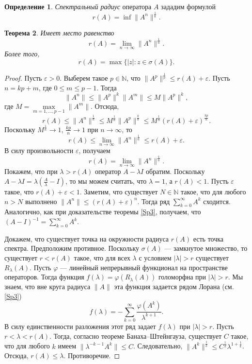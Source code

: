\documentclass[12pt, titlepage, oneside]{amsbook}
\newcommand{\NN}{\mathbb{N}}
\newtheorem{theorem}{Теорема}[chapter]
\theoremstyle{definition}
\newtheorem{definition}[theorem]{Определение}
\theoremstyle{remark}
\begin{document}
\begin{definition}
	\emph{Спектральный радиус} оператора $A$ зададим формулой $$r(A)=\inf\|A^n\|^{\frac{1}{n}}.$$
\end{definition}

\begin{theorem}
	\label{Sp6}
	Имеет место равенство
	$$r(A)=\lim\limits_{n\rightarrow\infty}\|A^n\|^{\frac{1}{n}}.$$ Более того, $$r(A)=\max\{|z|:z\in\sigma(A)\}.$$
\end{theorem}

\begin{proof}
	Пусть $\varepsilon>0$. Выберем такое $p\in\NN$, что $\|A^p\|^{\frac{1}{p}}\leq r(A)+\varepsilon$. Пусть $n=kp+m$, где $0\leq m\leq p-1$. Тогда $$\|A^n\|\leq\|A^p\|^k\|A^m\|\leq M\|A^p\|^k,$$ где $M=\max\limits_{m=1,\ldots,p-1}\|A^m\|$. Отсюда, $$r(A)\leq\|A^n\|^{\frac{1}{n}}\leq M^{\frac{1}{n}}\|A^p\|^{\frac{k}{n}}\leq M^{\frac{1}{n}}(r(A)+\varepsilon)^{\frac{kp}{n}}.$$ Поскольку $M^{\frac{1}{n}}\rightarrow 1$, $\frac{kp}{n}\rightarrow 1$ при $n\rightarrow\infty$, то $$r(A)\leq\lim\limits_{n\rightarrow\infty}\|A^n\|^{\frac{1}{n}}\leq r(A)+\varepsilon.$$ В силу произвольности $\varepsilon$, получаем $$r(A)=\lim\limits_{n\rightarrow\infty}\|A^n\|^{\frac{1}{n}}.$$ Покажем, что при $\lambda>r(A)$ оператор $A-\lambda I$ обратим. Поскольку $A-\lambda I=\lambda(\frac{A}{\lambda}-I)$, то мы можем считать, что $\lambda=1$, а $r(A)<1$. Пусть $\varepsilon$ такое, что $r(A)+\varepsilon<1$. Заметим, что существует $N\in\NN$ такое, что для любого $n>N$ выполнено $\|A^n\|\leq (r(A)+\varepsilon)^n$. Тогда ряд $\sum\limits_{k=0}^{\infty} A^k$ сходится. Аналогично, как при доказательстве теоремы \ref{Sp3}, получаем, что $(A-I)^{-1}=\sum\limits_{k=0}^{\infty} A^k$.
	
	Докажем, что существует точка на окружности радиуса $r(A)$ есть точка спектра. Предположим противное. Поскольку $\sigma(A)$ --- замкнутое множество, то существует $r<r(A)$ такое, что для всех $\lambda$ с условием $|\lambda|>r$ существует $R_{\lambda}(A)$. Пусть $\varphi$ --- линейный непрерывный функционал на пространстве операторов. Тогда функция $f(\lambda)=\varphi(R_{\lambda}(A))$ голоморфна при $|\lambda|>r$. Мы знаем, что вне круга радиуса $\|A\|$ эта функция задается рядом Лорана (см. \ref{Sp3}) $$f(\lambda)=-\sum\limits_{k=0}^{\infty}\frac{\varphi(A^k)}{\lambda^{k+1}}.$$ В силу единственности разложения этот ряд задает $f(\lambda)$ при $|\lambda|>r$. Пусть $r<\lambda<r(A)$. Тогда, согласно теореме Банаха--Штейнгауза, существует $C$ такое, что для любого $k$ имеем $\|\lambda^{-k-1}A^k\|\leq C$. Следовательно, $\|A^k\|^{\frac{1}{k}}\leq C^{\frac{1}{k}}\lambda^{1+\frac{1}{k}}$. Отсюда, $r(A)\leq\lambda$. Противоречие.
\end{proof}
\end{document}
